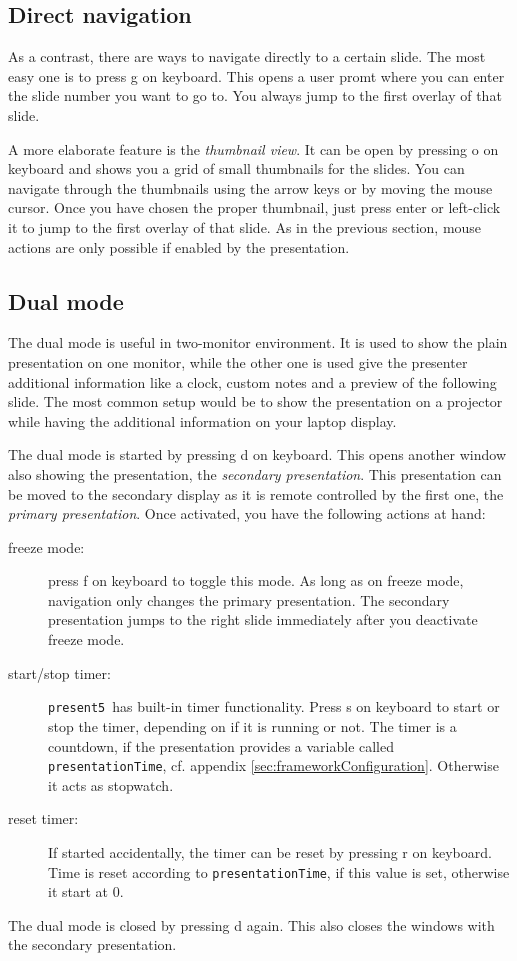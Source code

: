 \documentclass{scrartcl}
\newcommand{\present}{\code{present5}}
\newcommand{\code}[1]{{\tt #1}}
\begin{document}
\subsection{Direct navigation}
\label{subsection:directNavigation}

As a contrast, there are ways to navigate directly to a certain slide. The most easy one is to press g on keyboard. This opens a user promt where you can enter the slide number you want to go to. You always jump to the first overlay of that slide.

A more elaborate feature is the \emph{thumbnail view}. It can be open by pressing o on keyboard and shows you a grid of small thumbnails for the slides. You can navigate through the thumbnails using the arrow keys or by moving the mouse cursor. Once you have chosen the proper thumbnail, just press enter or left-click it to jump to the first overlay of that slide. As in the previous section, mouse actions are only possible if enabled by the presentation.

\subsection{Dual mode}
\label{subsection:dualMode}

The dual mode is useful in two-monitor environment. It is used to show the plain presentation on one monitor, while the other one is used give the presenter additional information like a clock, custom notes and a preview of the following slide. The most common setup would be to show the presentation on a projector while having the additional information on your laptop display.

The dual mode is started by pressing d on keyboard. This opens another window also showing the presentation, the \emph{secondary presentation}. This presentation can be moved to the secondary display as it is remote controlled by the first one, the \emph{primary presentation}. Once activated, you have the following actions at hand:
\begin{description}
\item[freeze mode:] press f on keyboard to toggle this mode. As long as on freeze mode, navigation only changes the primary presentation. The secondary presentation jumps to the right slide immediately after you deactivate freeze mode.
\item[start/stop timer:] \present~has built-in timer functionality. Press s on keyboard to start or stop the timer, depending on if it is running or not. The timer is a countdown, if the presentation provides a variable called \code{presentationTime}, cf. appendix \ref{sec:frameworkConfiguration}. Otherwise it acts as stopwatch.
\item[reset timer:] If started accidentally, the timer can be reset by pressing r on keyboard. Time is reset according to \code{presentationTime}, if this value is set, otherwise it start at 0.
\end{description}
The dual mode is closed by pressing d again. This also closes the windows with the secondary presentation.
\end{document}
